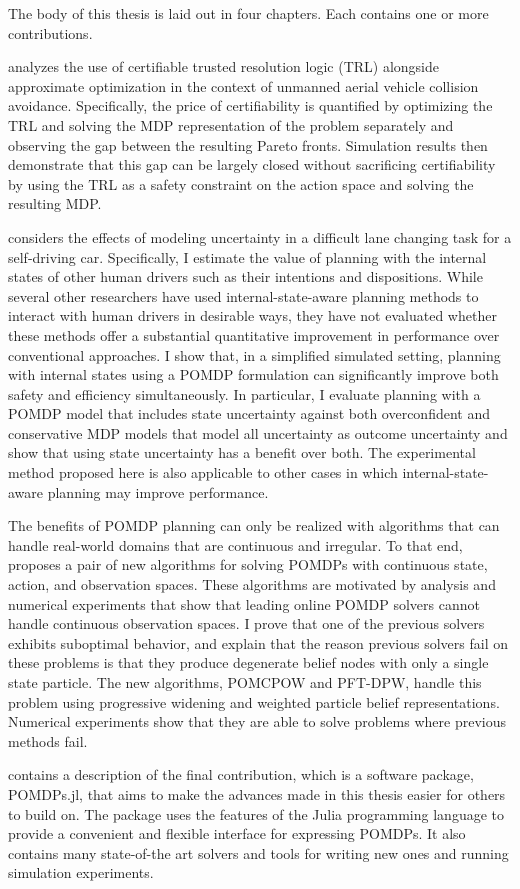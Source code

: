 The body of this thesis is laid out in four chapters.
Each contains one or more contributions.

 analyzes the use of certifiable trusted resolution logic (TRL) alongside approximate optimization in the context of unmanned aerial vehicle collision avoidance.
Specifically, the price of certifiability is quantified by optimizing the TRL and solving the MDP representation of the problem separately and observing the gap between the resulting Pareto fronts.
Simulation results then demonstrate that this gap can be largely closed without sacrificing certifiability by using the TRL as a safety constraint on the action space and solving the resulting MDP.

 considers the effects of modeling uncertainty in a difficult lane changing task for a self-driving car.
Specifically, I estimate the value of planning with the internal states of other human drivers such as their intentions and dispositions.
While several other researchers have used internal-state-aware planning methods to interact with human drivers in desirable ways, they have not evaluated whether these methods offer a substantial quantitative improvement in performance over conventional approaches.
I show that, in a simplified simulated setting, planning with internal states using a POMDP formulation can significantly improve both safety and efficiency simultaneously.
In particular, I evaluate planning with a POMDP model that includes state uncertainty against both overconfident and conservative MDP models that model all uncertainty as outcome uncertainty and show that using state uncertainty has a benefit over both.
The experimental method proposed here is also applicable to other cases in which internal-state-aware planning may improve performance.

The benefits of POMDP planning can only be realized with algorithms that can handle real-world domains that are continuous and irregular.
To that end,  proposes a pair of new algorithms for solving POMDPs with continuous state, action, and observation spaces.
These algorithms are motivated by analysis and numerical experiments that show that leading online POMDP solvers cannot handle continuous observation spaces.
I prove that one of the previous solvers exhibits suboptimal behavior, and explain that the reason previous solvers fail on these problems is that they produce degenerate belief nodes with only a single state particle.
The new algorithms, POMCPOW and PFT-DPW, handle this problem using progressive widening and weighted particle belief representations.
Numerical experiments show that they are able to solve problems where previous methods fail.

 contains a description of the final contribution, which is a software package, POMDPs.jl, that aims to make the advances made in this thesis easier for others to build on.
The package uses the features of the Julia programming language to provide a convenient and flexible interface for expressing POMDPs.
It also contains many state-of-the art solvers and tools for writing new ones and running simulation experiments.
